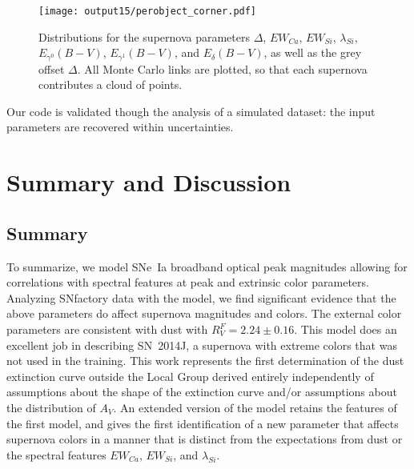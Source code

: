 \documentclass{aastex61}   	%
\begin{document}
\begin{figure}[htbp] %
   \centering
   \texttt{[image: output15/perobject\_corner.pdf]} 
   \caption{
   \color{red}
   Distributions for the supernova parameters $\Delta$, $EW_{Ca}$, $EW_{Si}$, $\lambda_{Si}$, $E_{\gamma^0}(B-V)$,  $E_{\gamma^1}(B-V)$,  and $E_{\delta}(B-V)$, as well as the grey offset
$\Delta$.  All Monte Carlo links are plotted, so that each supernova contributes a cloud of points.
\color{black}
   \label{perobject2:fig}}
\end{figure}


Our code is validated
though the analysis of a simulated dataset: the input parameters are recovered within  uncertainties.
\color{black}

\section{Summary and Discussion}
\label{discussion:sec}
\subsection{Summary}
To summarize, we model SNe~Ia broadband optical peak magnitudes allowing for correlations with spectral features at peak and
extrinsic color parameters.  Analyzing SNfactory data with the model, we find significant evidence that the above parameters do
affect supernova magnitudes and colors.  The external color parameters are consistent with \citet{1999PASP..111...63F} dust
with $R^F_V=2.24 \pm 0.16$.  This model  does an excellent job in
describing SN~2014J, a supernova with extreme colors that was not used in the training.  
This work represents the first determination of the dust extinction curve outside the Local Group
derived entirely independently of assumptions about the shape of the extinction curve and/or assumptions about the
distribution of $A_V$.  An extended version
of the model retains the features of the first model, and gives the first identification of  a new parameter that affects supernova
colors in a manner that is distinct from  the expectations from dust or the spectral features $EW_{Ca}$, $EW_{Si}$, and $\lambda_{Si}$.
\end{document}
